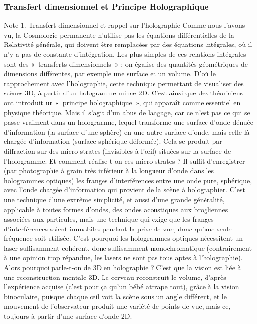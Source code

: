 \documentclass[a4paper,12pt]{article}
\begin{document}
\subsubsection{Transfert dimensionnel et Principe Holographique }
Note 1. Transfert dimensionnel et rappel sur l'holographie 
Comme nous l'avons vu, la Cosmologie permanente n'utilise pas les équations différentielles de la Relativité générale, qui doivent être remplacées par des équations intégrales, où il n'y a pas de constante d'intégration. Les plus simples de ces relations intégrales sont des « transferts dimensionnels » : on égalise des quantités géométriques de dimensions différentes, par exemple une surface et un volume.
D'où le rapprochement avec l'holographie, cette technique permettant de visualiser des scènes 3D, à partir d'un hologramme mince 2D. C'est ainsi que des théoriciens ont introduit un « principe holographique », qui apparaît comme essentiel en physique théorique.
Mais il s'agit d'un abus de langage, car ce n'est pas ce qui se passe vraiment dans un hologramme, lequel transforme une surface d'onde dénuée d'information (la surface d'une sphère) en une autre surface d'onde, mais celle-là chargée d'information (surface sphérique déformée). Cela se produit par diffraction sur des micro-strates (invisibles à l’œil) situées sur la surface de l'hologramme. Et comment réalise-t-on ces micro-strates ? Il suffit d'enregistrer (par photographie à grain très inférieur à la longueur d'onde dans les hologrammes optiques) les franges d'interférences entre une onde pure, sphérique, avec l'onde chargée d'information qui provient de la scène à holographier. C'est une technique d'une extrême simplicité, et aussi d'une grande généralité, applicable à toutes formes d'ondes, des ondes acoustiques aux brogliennes associées aux particules, mais une  technique qui exige que les franges d'interférences soient immobiles pendant la prise de vue, donc qu'une seule fréquence soit utilisée. C'est pourquoi les hologrammes optiques nécessitent un laser suffisamment cohérent, donc suffisamment monochromatique (contrairement à une opinion trop répandue, les lasers ne sont pas tous aptes à l'holographie). 
Alors pourquoi parle-t-on de 3D en holographie ? C'est que la vision est liée à une reconstruction mentale 3D. Le cerveau reconstruit le volume, d'après l'expérience acquise (c'est pour ça qu'un bébé attrape tout), grâce à la vision binoculaire, puisque chaque œil voit la scène sous un angle différent, et le mouvement de l'observateur produit une variété de points de vue, mais ce, toujours à partir d'une surface d'onde 2D.
\end{document}
